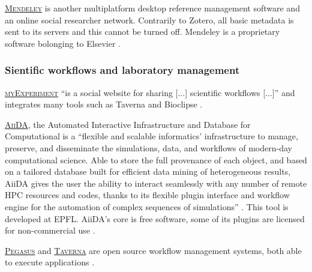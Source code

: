 \vspace{0.4cm}

\noindent {} \textsc{\href{https://www.mendeley.com/}{Mendeley}} is another multiplatform desktop reference management software and an online social researcher network. Contrarily to Zotero, all basic metadata is sent to its servers and this cannot be turned off. Mendeley is a proprietary software bolonging to Elsevier \cite{mendeley.com_mendeley_2015}. 

\subsubsection{Sientific workflows and laboratory management}

\noindent {} \textsc{\href{http://www.myexperiment.org}{myExperiment}} ``is a social website for sharing [...] scientific workflows [...]'' and integrates many tools such as Taverna and Bioclipse \cite{myexperiment_myexperiment_2014,myexperiment.org_myexperiment_2015}.

\vspace{0.4cm}

\noindent {}  \textsc{\href{http://www.aiida.net/}{AiiDA}}, the Automated Interactive Infrastructure and Database for Computational is a ``flexible and scalable informatics' infrastructure to manage, preserve, and disseminate the simulations, data, and workflows of modern-day computational science. Able to store the full provenance of each object, and based on a tailored database built for efficient data mining of heterogeneous results, AiiDA gives the user the ability to interact seamlessly with any number of remote HPC resources and codes, thanks to its flexible plugin interface and workflow engine for the automation of complex sequences of simulations'' \cite{aiida.net_aiida_2015}. This tool is developed at EPFL. AiiDA's core is free software, some of its plugins are licensed for non-commercial use \cite{pizzi_aiida:_2015}.

\vspace{0.4cm}

\noindent {}  \textsc{\href{http://pegasus.isi.edu/}{Pegasus}} and \textsc{\href{http://www.taverna.org.uk/}{Taverna}} are open source workflow management systems, both able to execute applications \cite{pegasus_pegasus_2015,taverna_taverna_2015}.

\vspace{0.4cm}

